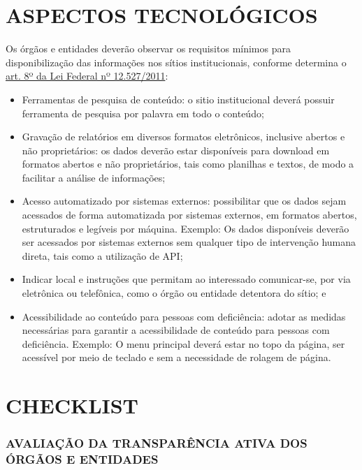 \documentclass[
]{book}
\begin{document}
\hypertarget{aspectos-tecnoluxf3gicos}{%
\chapter{ASPECTOS TECNOLÓGICOS}\label{aspectos-tecnoluxf3gicos}}

Os órgãos e entidades deverão observar os requisitos mínimos para disponibilização das informações nos sítios institucionais, conforme determina o \href{http://www.planalto.gov.br/ccivil_03/_ato2011-2014/2011/lei/l12527.htm\#art8\%C2\%A73}{art. 8º da Lei Federal nº 12.527/2011}:

\begin{itemize}
\item
  Ferramentas de pesquisa de conteúdo: o sitio institucional deverá possuir ferramenta de pesquisa por palavra em todo o conteúdo;
\item
  Gravação de relatórios em diversos formatos eletrônicos, inclusive abertos e não proprietários: os dados deverão estar disponíveis para download em formatos abertos e não proprietários, tais como planilhas e textos, de modo a facilitar a análise de informações;
\item
  Acesso automatizado por sistemas externos: possibilitar que os dados sejam acessados de forma automatizada por sistemas externos, em formatos abertos, estruturados e legíveis por máquina. Exemplo: Os dados disponíveis deverão ser acessados por sistemas externos sem qualquer tipo de intervenção humana direta, tais como a utilização de API;
\item
  Indicar local e instruções que permitam ao interessado comunicar-se, por via eletrônica ou telefônica, como o órgão ou entidade detentora do sítio; e
\item
  Acessibilidade ao conteúdo para pessoas com deficiência: adotar as medidas necessárias para garantir a acessibilidade de conteúdo para pessoas com deficiência. Exemplo: O menu principal deverá estar no topo da página, ser acessível por meio de teclado e sem a necessidade de rolagem de página.
\end{itemize}

\hypertarget{checklist}{%
\chapter{CHECKLIST}\label{checklist}}

\hypertarget{avaliauxe7uxe3o-da-transparuxeancia-ativa-dos-uxf3rguxe3os-e-entidades}{%
\subsection*{AVALIAÇÃO DA TRANSPARÊNCIA ATIVA DOS ÓRGÃOS E ENTIDADES}\label{avaliauxe7uxe3o-da-transparuxeancia-ativa-dos-uxf3rguxe3os-e-entidades}}
\end{document}
